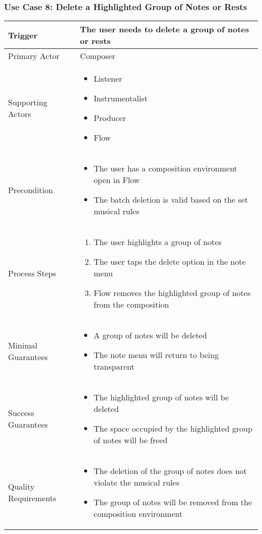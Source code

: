 
\subsubsection{Use Case 8: Delete a Highlighted Group of Notes or Rests}

\begin{tabularx}{\textwidth}{|X|X|}
\hline
Trigger & 
The user needs to delete a group of notes or rests \\
\hline
Primary Actor & 
Composer \\
\hline
Supporting Actors & 
\begin{itemize}
\item Listener
\item Instrumentalist
\item Producer
\item Flow
\end{itemize} \\
\hline
Precondition & 
\begin{itemize}
\item The user has a composition environment open in Flow
\item The batch deletion is valid based on the set musical rules
\end{itemize} \\
\hline
Process Steps & 
\begin{enumerate}
\item The user highlights a group of notes
\item The user taps the delete option in the note menu
\item Flow removes the highlighted group of notes from the composition
\end{enumerate} \\
\hline
Minimal Guarantees & 
\begin{itemize}
  \item A group of notes will be deleted
  \item The note menu will return to being transparent
\end{itemize} \\
\hline
Success Guarantees & 
\begin{itemize}
  \item The highlighted group of notes will be deleted 
  \item The space occupied by the highlighted group of notes will be freed
\end{itemize} \\
\hline
Quality Requirements & 
\begin{itemize}
\item The deletion of the group of notes does not violate the musical rules
\item The group of notes will be removed from the composition environment
\end{itemize} \\ 
\hline
\end{tabularx}



